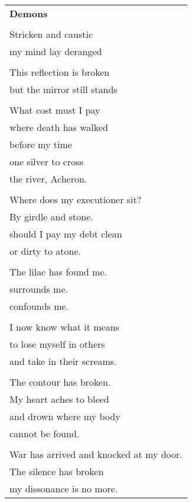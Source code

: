 \documentclass{article}
\begin{document}
\newcommand{\h}{\hspace{3ex}}
\newcommand{\hoar}{%
\begin{center}
\line(1,0){350}
\end{center}
}

\begin{center}
\begin{tabular}{l}
\textbf{Demons} \\
\\
Stricken and caustic \\
my mind lay deranged \\
\\
This reflection is broken \\
but the mirror still stands \\
\\
What cost must I pay \\
where death has walked \\
before my time \\
one silver to cross \\
the river, Acheron. \\
\\
Where does my executioner sit? \\
By girdle and stone. \\ %
should I pay my debt clean \\ %
or dirty to atone. \\ %
\\
The lilac has found me. \\
surrounds me. \\
confounds me. \\
\\
I now know what it means \\
to lose myself in others \\
and take in their screams. \\
\\
The contour has broken. \\
My heart aches to bleed \\
and drown where my body \\
cannot be found. \\
\\
War has arrived and knocked at my door. \\
The silence has broken \\
my dissonance is no more. \\

\end{tabular}
\end{center}
\end{document}
